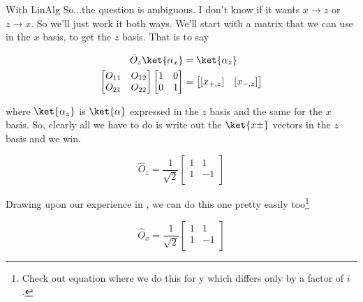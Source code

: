 \begin{answer}

  \begin{answerpart}{With LinAlg}
    So...the question is ambiguous.  I don't know if it wants $x
    \rightarrow z$ or $z \rightarrow x$.  So we'll just work it both
    ways. We'll start with a matrix that we can use in the $x$ basis,
    to get the $z$ basis. That is to say

    \begin{equation}
      \begin{split}
        \hat{O}_z\ket{\alpha_x} &= \ket{\alpha_z}\\
        \begin{bmatrix}
          O_{11} & O_{12}\\
          O_{21} & O_{22}\\
        \end{bmatrix}
        \begin{bmatrix}
          1 & 0\\
          0 & 1\\
        \end{bmatrix}
        &= 
        \begin{bmatrix}
          [x_{+,z}] & [x_{-,z}]\\
        \end{bmatrix}
      \end{split}
    \end{equation}

    where $\ket{\alpha_z}$ is $\ket{\alpha}$ expressed in the $z$
    basis and the same for the $x$ basis.  So, clearly all we have to
    do is write out the $\ket{x\pm}$ vectors in the $z$ basis and we
    win.

    \begin{equation}
      \hat{O}_z
      =
      \frac{1}{\sqrt{2}}
      \begin{bmatrix}
        1 & 1\\
        1 & -1\\
      \end{bmatrix}
    \end{equation}

    Drawing upon our experience in , we can
    do this one pretty easily too\footnote{Check out equation
     where we do this for y which differs
    only by a factor of $i$.}
    
    \begin{equation}
      \hat{O}_x
      =
      \frac{1}{\sqrt{2}}
      \begin{bmatrix}
        1 & 1\\
        1 & -1\\
      \end{bmatrix}
    \end{equation}


\end{answerpart}
\end{answer}
